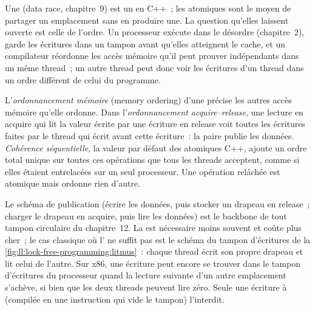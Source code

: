 Une  (data race, chapitre~9) est un  en C++~; les atomiques sont le moyen de partager un emplacement sans en produire une. La
question qu'elles laissent ouverte est celle de l'ordre. Un processeur exécute dans le désordre (chapitre~2), garde les écritures dans un tampon avant
qu'elles atteignent le cache, et un compilateur réordonne les accès mémoire qu'il peut prouver indépendants dans un même thread~; un autre thread peut
donc voir les écritures d'un thread dans un ordre différent de celui du programme.

\begin{definition}\label{def:ll:lock-free-programming:ordering}
L'\emph{ordonnancement mémoire} (memory ordering) d'une  précise les autres accès mémoire qu'elle ordonne.
Dans l'\emph{ordonnancement acquire--release}, une lecture en acquire qui lit la valeur écrite par une
écriture en release voit toutes les écritures faites par le thread qui écrit avant cette écriture~: la paire publie les données. \emph{Cohérence
séquentielle}, la valeur par défaut des atomiques C++, ajoute un ordre total unique sur toutes ces opérations
que tous les threads acceptent, comme si elles étaient entrelacées sur un seul processeur. Une opération relâchée est atomique mais ordonne
rien d'autre.
\end{definition}

Le schéma de publication (écrire les données, puis stocker un drapeau en release~; charger le drapeau en acquire, puis lire les données) est
le backbone de tout tampon circulaire du chapitre~12. La  est nécessaire moins souvent et coûte plus cher~; le cas classique
où l' ne suffit pas est le schéma du tampon d'écritures de la \cref{fig:ll:lock-free-programming:litmus}~: chaque
thread écrit son propre drapeau et lit celui de l'autre. Sur x86, une écriture peut encore se trouver dans le tampon d'écritures du processeur quand la
lecture suivante d'un autre emplacement s'achève, si bien que les deux threads peuvent lire zéro. Seule une écriture à  (compilée
en une instruction qui vide le tampon) l'interdit.

